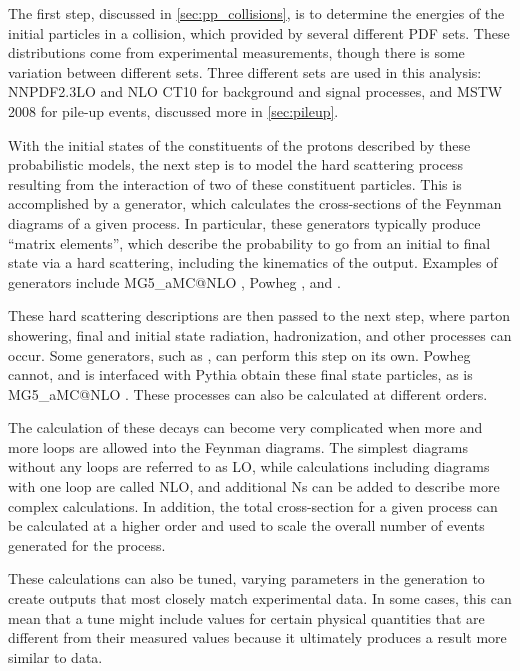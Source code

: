 The first step, discussed in \autoref{sec:pp_collisions}, is to determine the energies of the initial particles in a collision, which provided by several different \ac{PDF} sets. These distributions come from experimental measurements, though there is some variation between different sets. Three different sets are used in this analysis: NNPDF2.3LO \cite{Ball:2012cx} and NLO CT10 \cite{Lai:2010vv} for background and signal processes, and MSTW 2008 \cite{0901.0002} for pile-up events, discussed more in \autoref{sec:pileup}. 

With the initial states of the constituents of the protons described by these probabilistic models, the next step is to model the hard scattering process resulting from the interaction of two of these constituent particles. This is accomplished by a generator, which calculates the cross-sections of the Feynman diagrams of a given process. In particular, these generators typically produce ``matrix elements'', which describe the probability to go from an initial to final state via a hard scattering, including the kinematics of the output. Examples of generators include {\sc MG5\_aMC@NLO} \cite{Alwall:2014hca}, {\sc Powheg} \cite{PowhegBOX1,PowhegBOX2,PowhegBOX3}, and \sherpa \cite{sherpa}. 

These hard scattering descriptions are then passed to the next step, where parton showering, final and initial state radiation, hadronization, and other processes can occur. Some generators, such as \sherpa, can perform this step on its own. {\sc Powheg} cannot, and is interfaced with {\sc Pythia} \cite{Sjostrand:2006za} obtain these final state particles, as is {\sc MG5\_aMC@NLO} \cite{Sjostrand:2007gs}. These processes can also be calculated at different orders.

The calculation of these decays can become very complicated when more and more loops are allowed into the Feynman diagrams. The simplest diagrams without any loops are referred to as \ac{LO}, while calculations including diagrams with one loop are called \ac{NLO}, and additional Ns can be added to describe more complex calculations. In addition, the total cross-section for a given process can be calculated at a higher order and used to scale the overall number of events generated for the process. 

These calculations can also be tuned, varying parameters in the generation to create outputs that most closely match experimental data. In some cases, this can mean that a tune might include values for certain physical quantities that are different from their measured values because it ultimately produces a result more similar to data. 

